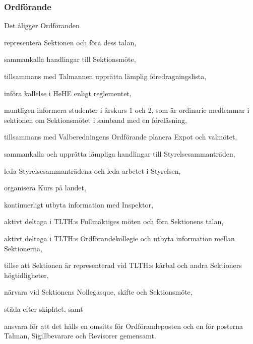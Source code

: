 \documentclass[10pt]{article}
\begin{document}
\subsubsection{Ordförande}
Det åligger Ordföranden
\begin{attlist}
    \item representera Sektionen och föra dess talan,
    \item sammankalla handlingar till Sektionsmöte,
    \item tillsammans med Talmannen upprätta lämplig föredragningslista,
    \item införa kallelse i HeHE enligt reglementet,
    \item muntligen informera studenter i årskurs 1 och 2, som är ordinarie medlemmar i sektionen om Sektionsmötet i samband med en föreläsning,
    \item tillsammans med Valberedningens Ordförande planera Expot och valmötet,
    \item sammankalla och upprätta lämpliga handlingar till Styrelsesammanträden,
    \item leda Styrelsesammanträdena och leda arbetet i Styrelsen,
    \item organisera Kurs på landet,
    \item kontinuerligt utbyta information med Inspektor,
    \item aktivt deltaga i TLTH:s Fullmäktiges möten och föra Sektionens talan,
    \item aktivt deltaga i TLTH:s Ordförandekollegie och utbyta information mellan Sektionerna,
    \item tillse att Sektionen är representerad vid TLTH:s kårbal och andra Sektioners högtidligheter,
    \item närvara vid Sektionens Nollegasque, skifte och Sektionsmöte,
    \item städa efter skiphtet, samt
    \item ansvara för att det hålls en omsitts för Ordförandeposten och en för posterna Talman, Sigillbevarare och Revisorer gemensamt.
\end{attlist}
\end{document}
